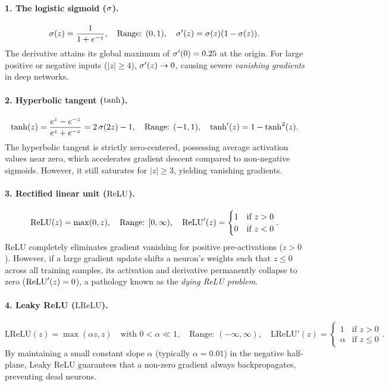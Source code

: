 \documentclass[../../main.tex]{subfiles}
\begin{document}
\paragraph{1. The logistic sigmoid ($\operatorname{\sigma}$).}
\begin{equation}
\label{eq:sigmoid_def}
\operatorname{\sigma}(z) = \frac{1}{1 + e^{-z}}, \quad \text{Range: } (0, 1), \quad \operatorname{\sigma}'(z) = \operatorname{\sigma}(z)(1 - \operatorname{\sigma}(z)).
\end{equation}
The derivative attains its global maximum of $\operatorname{\sigma}'(0) = 0.25$ at the origin. For large positive or negative inputs ($|z| \ge 4$), $\operatorname{\sigma}'(z) \to 0$, causing severe \emph{vanishing gradients} in deep networks.

\paragraph{2. Hyperbolic tangent ($\tanh$).}
\begin{equation}
\label{eq:tanh_def}
\tanh(z) = \frac{e^z - e^{-z}}{e^z + e^{-z}} = 2\operatorname{\sigma}(2z) - 1, \quad \text{Range: } (-1, 1), \quad \tanh'(z) = 1 - \tanh^2(z).
\end{equation}
The hyperbolic tangent is strictly zero-centered, possessing average activation values near zero, which accelerates gradient descent compared to non-negative sigmoids. However, it still saturates for $|z| \ge 3$, yielding vanishing gradients.

\paragraph{3. Rectified linear unit ($\operatorname{\mathrm{ReLU}}$).}
\begin{equation}
\label{eq:relu_def}
\operatorname{\mathrm{ReLU}}(z) = \max(0, z), \quad \text{Range: } [0, \infty), \quad \operatorname{\mathrm{ReLU}}'(z) = \begin{cases} 1 & \text{if } z > 0 \\ 0 & \text{if } z < 0 \end{cases}.
\end{equation}
ReLU completely eliminates gradient vanishing for positive pre-activations ($z > 0$). However, if a large gradient update shifts a neuron's weights such that $z \le 0$ across all training samples, its activation and derivative permanently collapse to zero ($\operatorname{\mathrm{ReLU}}'(z) = 0$), a pathology known as the \emph{dying ReLU problem}.

\paragraph{4. Leaky ReLU ($\text{LReLU}$).}
\begin{equation}
\label{eq:leaky_relu_def}
\text{LReLU}(z) = \max(\alpha z, z) \quad \text{with } 0 < \alpha \ll 1, \quad \text{Range: } (-\infty, \infty), \quad \text{LReLU}'(z) = \begin{cases} 1 & \text{if } z > 0 \\ \alpha & \text{if } z \le 0 \end{cases}.
\end{equation}
By maintaining a small constant slope $\alpha$ (typically $\alpha = 0.01$) in the negative half-plane, Leaky ReLU guarantees that a non-zero gradient always backpropagates, preventing dead neurons.
\end{document}
